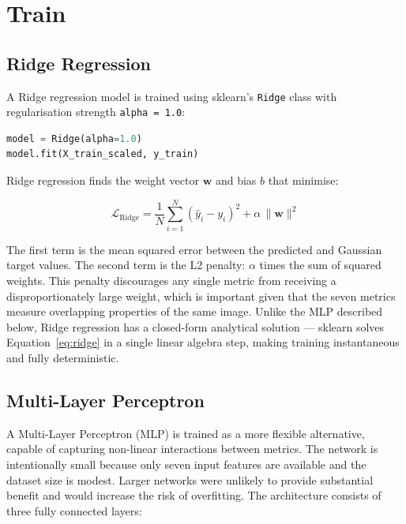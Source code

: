 \documentclass{article}
\begin{document}
\section{Train}

\subsection*{Ridge Regression}

A Ridge regression model is trained using sklearn's \texttt{Ridge} class with regularisation strength \texttt{alpha = 1.0}:\cite{Scikit_Ridge}

\begin{lstlisting}[language=Python, caption={Snippet from ridge\_regression.py \cite{Ridge}}, basicstyle=\ttfamily\small, frame=single, breaklines=true]
model = Ridge(alpha=1.0)
model.fit(X_train_scaled, y_train)
\end{lstlisting}

Ridge regression finds the weight vector $\mathbf{w}$ and bias $b$ that minimise:

\begin{equation}
    \mathcal{L}_{\text{Ridge}} = \frac{1}{N}\sum_{i=1}^{N}\left(\hat{y}_i - y_i\right)^2 + \alpha\,\|\mathbf{w}\|^2
    \label{eq:ridge}
\end{equation}

The first term is the mean squared error between the predicted and Gaussian target values. The second term is the L2 penalty: $\alpha$ times the sum of squared weights. This penalty discourages any single metric from receiving a disproportionately large weight, which is important given that the seven metrics measure overlapping properties of the same image. Unlike the MLP described below, Ridge regression has a closed-form analytical solution --- sklearn solves Equation~\ref{eq:ridge} in a single linear algebra step, making training instantaneous and fully deterministic.\cite{Scikit_Ridge}

\subsection*{Multi-Layer Perceptron}

A Multi-Layer Perceptron (MLP) is trained as a more flexible alternative, capable of capturing non-linear interactions between metrics. The network is intentionally small because only seven input features are available and the dataset size is modest. Larger networks were unlikely to provide substantial benefit and would increase the risk of overfitting. The architecture consists of three fully connected layers:
\end{document}
